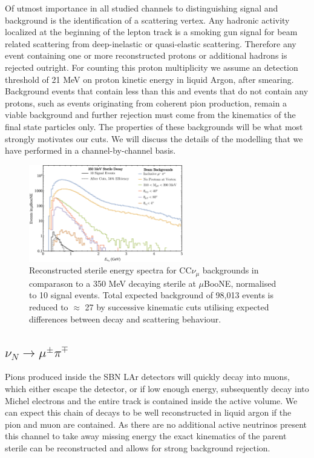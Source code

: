 \documentclass[11pt, a4paper]{article}
\begin{document}
Of utmost importance in all studied channels to distinguishing signal and background is the identification of a scattering vertex. Any hadronic activity localized at the beginning of the lepton track is a smoking gun signal for beam related scattering from deep-inelastic or quasi-elastic scattering. Therefore any event containing one or more reconstructed protons or additional hadrons is rejected outright. For counting this proton multiplicity we assume an detection threshold of 21 MeV on proton kinetic energy in liquid Argon, after smearing. Background events that contain less than this and events that do not contain any protons, such as events originating from coherent pion production, remain a viable background and further rejection must come from the kinematics of the final state particles only. The properties of these backgrounds will be what most strongly motivates our cuts. We will discuss the details of the modelling that we have performed in a channel-by-channel basis. 

\begin{figure}[h]
\center
\includegraphics[width=0.6\textwidth,clip,trim=0 0 0 0]{figures/mu_pi_cutflow.pdf}
\caption{\label{fig:mu_pi_cutflow} Reconstructed sterile energy spectra for CC$\nu_\mu$ backgrounds in comparason to a 350 MeV decaying sterile at $\mu$BooNE, normalised to 10 signal events. Total expected background of 98,013 events is reduced to $\approx$ 27 by successive kinematic cuts utilising expected differences between decay and scattering behaviour. }

\end{figure}
\subsection{$\nu_N \rightarrow \mu^\pm \pi^\mp$ }

Pions produced inside the SBN LAr detectors will quickly decay into muons,
which either escape the detector, or if low enough energy, subsequently decay into Michel electrons and the entire track is contained inside the active volume. We can expect this chain of decays to be well reconstructed in liquid argon if the
pion and muon are contained. As there are no additional active neutrinos present this channel to take away missing energy the exact kinematics of the parent sterile can be reconstructed and allows for strong background rejection. 
\end{document}
